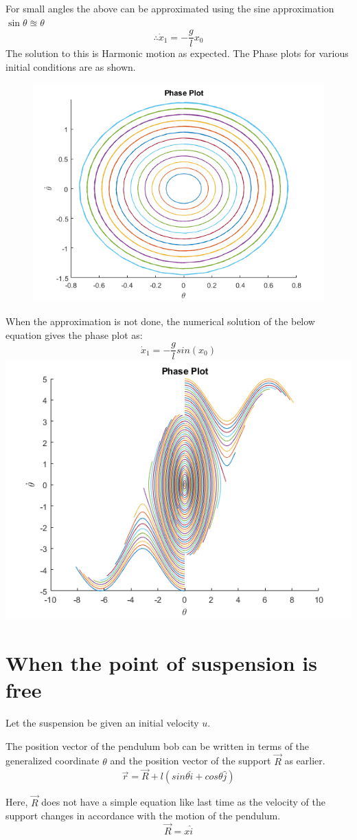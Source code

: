 \documentclass{article}
\begin{document}
	For small angles the above can be approximated using the sine approximation $ \sin \theta \approxeq \theta $
	\[ \therefore  \dot x_1 = -\frac{g}{l}x_0  \]
	The solution to this is Harmonic motion as expected.
	The Phase plots for various initial conditions are as shown.
	\begin{figure}[h!]
		\centering
		\includegraphics[width=0.5\linewidth]{Case1Plot1SmallAngles}
	\end{figure}

	
	When the approximation is not done, the numerical solution of the below equation gives the phase plot as:
	\[  \dot x_1 = -\frac{g}{l}sin(x_0) \]
	\includegraphics[width=0.5\linewidth]{Case1Plot2Directrix}



	\section{When the point of suspension is free}
	Let the suspension be given an initial velocity $ u $.
		
	The position vector of the pendulum bob can be written in terms of the generalized coordinate $\theta$ and the position vector of the support $ \vec{R} $ as earlier.
	\[ \vec{r} = \vec{R} + l(sin\theta \hat{i} + cos\theta \hat{j} )\]
	
	Here, $ \vec{R} $ does not have a simple equation like last time as the velocity of the support changes in accordance with the motion of the pendulum.
	\[ \vec{R} = x\hat{i} \]
	
\end{document}
